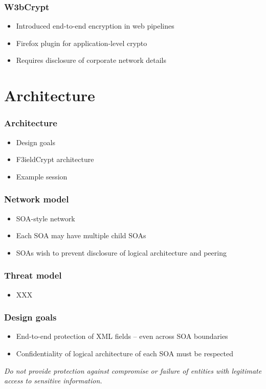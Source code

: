 \documentclass{beamer}
\begin{document}
\begin{frame}
\frametitle{W3bCrypt}
\begin{itemize}
\item Introduced end-to-end encryption in web pipelines
\item Firefox plugin for application-level crypto
\item Requires disclosure of corporate network details
\end{itemize}
\end{frame}

\section{Architecture}
\begin{frame}
\frametitle{Architecture}
\begin{itemize}
\item Design goals
\item F3ieldCrypt architecture
\item Example session
\end{itemize}
\end{frame}

\begin{frame}
\frametitle{Network model}
\begin{itemize}
\item SOA-style network
\item Each SOA may have multiple child SOAs
\item SOAs wish to prevent disclosure of logical architecture and peering 
\end{itemize}
\end{frame}

\begin{frame}
\frametitle{Threat model}
\begin{itemize}
\item XXX
\end{itemize}
\end{frame}

\begin{frame}
\frametitle{Design goals}
\begin{itemize}
\item End-to-end protection of XML fields -- even across SOA boundaries
\item Confidentiality of logical architecture of each SOA must be respected
\end{itemize}
\emph{Do not provide protection against compromise or failure of entities with
legitimate access to sensitive information.}
\end{frame}
\end{document}

